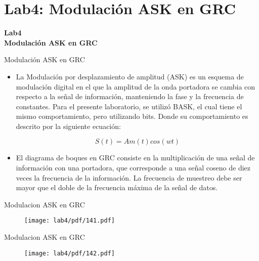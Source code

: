 \section{Lab4: Modulación ASK en GRC}

\begin{frame}{}


\bfseries{\textrm{\LARGE Lab4\\ \Large Modulación ASK en GRC}}
\raggedright
\end{frame}

\begin{frame}{Modulación ASK en GRC}


\begin{itemize}
  \item {
La Modulación por desplazamiento de amplitud (ASK) es un
esquema de modulación digital en el que la amplitud de la
onda portadora se cambia con respecto a la señal de
información, manteniendo la fase y la frecuencia de constantes.
Para el presente laboratorio, se utilizó BASK, el cual tiene el
mismo comportamiento, pero utilizando bits. Donde su
comportamiento es descrito por la siguiente ecuación:

$$S(t)=Am(t)cos(wt)$$

  }
  \item {
El diagrama de boques en GRC consiste en la multiplicación de
una señal de información con una portadora, que corresponde
a una señal coseno de diez veces la frecuencia de la
información. La frecuencia de muestreo debe ser mayor que el
doble de la frecuencia máxima de la señal de datos.
  }
  \end{itemize}

\end{frame}

\begin{frame}{Modulacion ASK en GRC}
\begin{figure}[H]
\centering
\texttt{[image: lab4/pdf/141.pdf]}
\end{figure}
\end{frame}

\begin{frame}{Modulacion ASK en GRC}
\begin{figure}[H]
\centering
\texttt{[image: lab4/pdf/142.pdf]}
\end{figure}
\end{frame}


